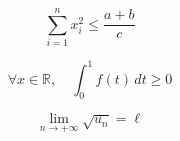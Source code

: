 \documentclass[10pt]{article}
\begin{document}
\[ \sum_{i=1}^{n} x_{i}^{2} \leqslant \frac{a+b}{c} \]

\[ \forall x \in \mathbb{R}, \quad \int_{0}^{1} f(t) \, dt \geqslant 0 \]

\[ \lim_{n \to +\infty} \sqrt{u_{n}} = \ell \]
\end{document}
